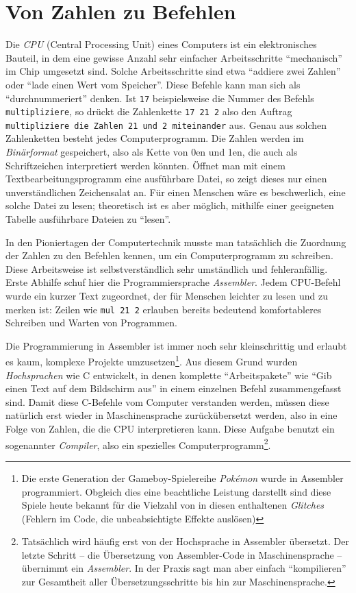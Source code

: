 \section{Von Zahlen zu Befehlen} \label{sec:assembly}
Die \emph{CPU} (Central Processing Unit) eines Computers ist ein elektronisches Bauteil, in dem eine gewisse Anzahl sehr einfacher Arbeitsschritte \enquote{mechanisch} im Chip umgesetzt sind. Solche Arbeitsschritte sind etwa \enquote{addiere zwei Zahlen} oder \enquote{lade einen Wert vom Speicher}. Diese Befehle kann man sich als \enquote{durchnummeriert} denken. Ist \texttt{17} beispielsweise die Nummer des Befehls \texttt{multipliziere}, so drückt die Zahlenkette \texttt{17 21 2} also den Auftrag \texttt{multipliziere die Zahlen 21 und 2 miteinander} aus. Genau aus solchen Zahlenketten besteht jedes Computerprogramm. Die Zahlen werden im \emph{Binärformat} gespeichert, also als Kette von 0en und 1en, die auch als Schriftzeichen interpretiert werden könnten. Öffnet man mit einem Textbearbeitungsprogramm eine ausführbare Datei, so zeigt dieses nur einen unverständlichen Zeichensalat an. Für einen Menschen wäre es beschwerlich, eine solche Datei zu lesen; theoretisch ist es aber möglich, mithilfe einer geeigneten Tabelle ausführbare Dateien zu \enquote{lesen}.

In den Pioniertagen der Computertechnik musste man tatsächlich die Zuordnung der Zahlen zu den Befehlen kennen, um ein Computerprogramm zu schreiben. Diese Arbeitsweise ist selbstverständlich sehr umständlich und fehleranfällig. Erste Abhilfe schuf hier die Programmiersprache \emph{Assembler}. Jedem CPU-Befehl wurde ein kurzer Text zugeordnet, der für Menschen leichter zu lesen und zu merken ist: Zeilen wie \texttt{mul 21 2} erlauben bereits bedeutend komfortableres Schreiben und Warten von Programmen.

Die Programmierung in Assembler ist immer noch sehr kleinschrittig und erlaubt es kaum, komplexe Projekte umzusetzen\footnote{Die erste Generation der Gameboy-Spielereihe \emph{Pokémon} wurde in Assembler programmiert. Obgleich dies eine beachtliche Leistung darstellt sind diese Spiele heute bekannt für die Vielzahl von in diesen enthaltenen \emph{Glitches} (Fehlern im Code, die unbeabsichtigte Effekte auslösen)}. Aus diesem Grund wurden \emph{Hochsprachen} wie C entwickelt, in denen komplette \enquote{Arbeitspakete} wie \enquote{Gib einen Text auf dem Bildschirm aus} in einem einzelnen Befehl zusammengefasst sind. Damit diese C-Befehle vom Computer verstanden werden, müssen diese natürlich erst wieder in Maschinensprache zurückübersetzt werden, also in eine Folge von Zahlen, die die CPU interpretieren kann. Diese Aufgabe benutzt ein sogenannter \emph{Compiler}, also ein spezielles Computerprogramm\footnote{Tatsächlich wird häufig erst von der Hochsprache in Assembler übersetzt. Der letzte Schritt -- die Übersetzung von Assembler-Code in Maschinensprache -- übernimmt ein \emph{Assembler}. In der Praxis sagt man aber einfach \enquote{kompilieren} zur Gesamtheit aller Übersetzungsschritte bis hin zur Maschinensprache.}.

